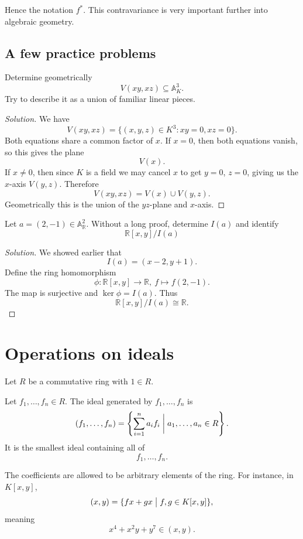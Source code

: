 \documentclass[11pt]{article}
\begin{document}
Hence the notation $f^*$. 
This contravariance is very important further into algebraic 
geometry. 

\subsection{A few practice problems}

\begin{prob}
    Determine geometrically 
    \[
        V(xy, xz) \subseteq \mathbb A_K^3. 
    \]
    Try to describe it as a union of familiar linear pieces. 
\end{prob}

\begin{proof}[Solution]
    We have 
    \[
        V(xy, xz) = \{(x,y,z) \in K^3 : xy = 0, xz = 0\}. 
    \]
    Both equations share a common factor of $x$. 
    If $x = 0$, then both equations vanish, so 
    this gives the plane 
    \[
        V(x). 
    \]
    If $x \neq 0$, then since $K$ is a field we may cancel 
    $x$ to get $y = 0$, $z = 0$, giving us the 
    $x$-axis $V(y,z)$. Therefore 
    \[
        V(xy,xz) = V(x) \cup V(y,z).
    \]
    Geometrically this is the union of the 
    $yz$-plane and $x$-axis.
\end{proof}

\begin{prob}
    Let $a = (2,-1) \in \mathbb A^2_{\mathbb R}$.
    Without a long proof, determine $I(a)$ and identify 
    \[
        \mathbb R[x,y]/I(a)
    \]
\end{prob}
\begin{proof}[Solution]
    We showed earlier that 
    $$
        I(a) = (x-2, y + 1).
    $$
    Define the ring homomorphism 
    $$
        \phi : \mathbb R[x,y] \to \mathbb R, \
        f \mapsto f(2,-1). 
    $$
    The map is surjective and $\ker \phi = I(a)$. 
    Thus 
    \[
        \mathbb R[x,y] / I(a) \cong \mathbb R.
    \]
\end{proof}

\section{Operations on ideals}

Let $R$ be a commutative ring with $1 \in R$. 

\begin{defn}
    Let $f_1,\ldots,f_n \in R$. The ideal generated by 
    $f_1,\ldots,f_n$ is 
    \[
        (f_1,\ldots,f_n) = \left\{\sum_{i=1}^n a_if_i \biggm| 
        a_1,\ldots,a_n \in R\right\}. 
    \]
    It is the smallest ideal containing all of 
    \[
        f_1,\ldots,f_n. 
    \]
\end{defn}
The coefficients are allowed to be arbitrary elements of the 
ring. For instance, in $K[x,y]$, 
\[
    (x,y) = \{fx+gx \bigm| f,g \in K[x,y]\},
\]
meaning 
\[
    x^4 + x^2y + y^7 \in (x,y). 
\]
\end{document}
